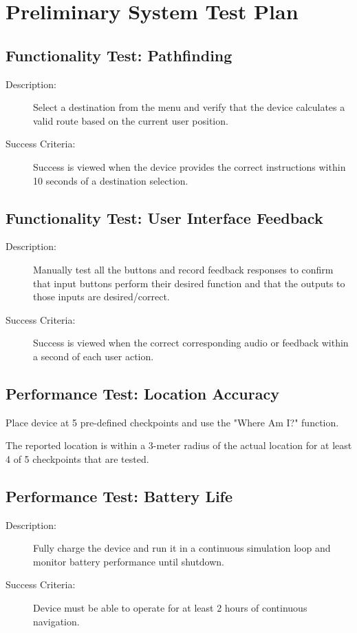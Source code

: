 \documentclass{article}
\begin{document}
\section{Preliminary System Test Plan}

\subsection{Functionality Test: Pathfinding}
\begin{description}
    \item[Description:] Select a destination from the menu and verify that the device calculates a valid route based on the current user position.
    \item[Success Criteria:] Success is viewed when the device provides the correct instructions within 10 seconds of a destination selection.
\end{description}

\subsection{Functionality Test: User Interface Feedback}
\begin{description}
    \item[Description:] Manually test all the buttons and record feedback responses to confirm that input buttons perform their desired function and that the outputs to those inputs are desired/correct.
    \item[Success Criteria:] Success is viewed when the correct corresponding audio or feedback within a second of each user action.
\end{description}

\subsection{Performance Test: Location Accuracy}
\begin{description}[style=nextline]
    \item[Description:] Place device at 5 pre-defined checkpoints and use the "Where Am I?" function.
    \item[Success Criteria:] The reported location is within a 3-meter radius of the actual location for at least 4 of 5 checkpoints that are tested.
\end{description}

\subsection{Performance Test: Battery Life}
\begin{description}
    \item[Description:] Fully charge the device and run it in a continuous simulation loop and monitor battery performance until shutdown.
    \item[Success Criteria:] Device must be able to operate for at least 2 hours of continuous navigation.
\end{description}
\end{document}
